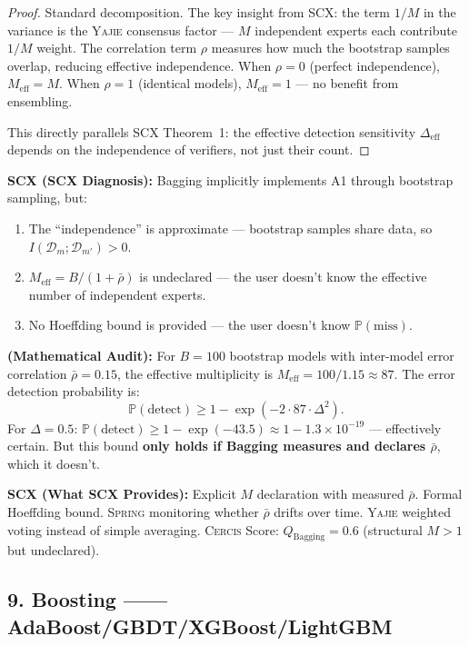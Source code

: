 \documentclass[12pt,a4paper]{article}
\theoremstyle{definition}
\newcommand{\Yajie}{\textsc{Yajie}}
\newcommand{\Spring}{\textsc{Spring}}
\newcommand{\Cercis}{\textsc{Cercis}}
\newcommand{\SCX}{\textsc{SCX}}
\newcommand{\Pbb}{\mathbb{P}}
\newcommand{\cD}{\mathcal{D}}
\newcommand{\whatMissing}{\noindent\textbf{SCX (What SCX Provides):} }
\newcommand{\diagnosis}{\noindent\textbf{SCX (SCX Diagnosis):} }
\newcommand{\mathAudit}{\noindent\textbf{ (Mathematical Audit):} }
\begin{document}
\begin{proof}
Standard decomposition. The key insight from \SCX{}: the term $1/M$ in the variance is the \Yajie{} consensus factor — $M$ independent experts each contribute $1/M$ weight. The correlation term $\rho$ measures how much the bootstrap samples overlap, reducing effective independence. When $\rho = 0$ (perfect independence), $M_{\text{eff}} = M$. When $\rho = 1$ (identical models), $M_{\text{eff}} = 1$ — no benefit from ensembling.

This directly parallels \SCX{} Theorem~1: the effective detection sensitivity $\Delta_{\text{eff}}$ depends on the independence of verifiers, not just their count.
\end{proof}

\diagnosis{} Bagging implicitly implements A1 through bootstrap sampling, but:
\begin{enumerate}[nosep]
    \item The ``independence'' is approximate — bootstrap samples share data, so $I(\cD_m; \cD_{m'}) > 0$.
    \item $M_{\text{eff}} = B/(1+\bar{\rho})$ is undeclared — the user doesn't know the effective number of independent experts.
    \item No Hoeffding bound is provided — the user doesn't know $\Pbb(\text{miss})$.
\end{enumerate}

\mathAudit{} For $B=100$ bootstrap models with inter-model error correlation $\bar{\rho}=0.15$, the effective multiplicity is $M_{\text{eff}} = 100/1.15 \approx 87$. The error detection probability is:
\[
\Pbb(\text{detect}) \ge 1 - \exp(-2 \cdot 87 \cdot \Delta^2).
\]
For $\Delta = 0.5$: $\Pbb(\text{detect}) \ge 1 - \exp(-43.5) \approx 1 - 1.3 \times 10^{-19}$ — effectively certain. But this bound \textbf{only holds if Bagging measures and declares $\bar{\rho}$}, which it doesn't.

\whatMissing{} Explicit $M$ declaration with measured $\bar{\rho}$. Formal Hoeffding bound. \Spring{} monitoring whether $\bar{\rho}$ drifts over time. \Yajie{} weighted voting instead of simple averaging. \Cercis{} Score: $Q_{\text{Bagging}} = 0.6$ (structural $M>1$ but undeclared).

\subsection{9. Boosting ——AdaBoost/GBDT/XGBoost/LightGBM}
\end{document}
